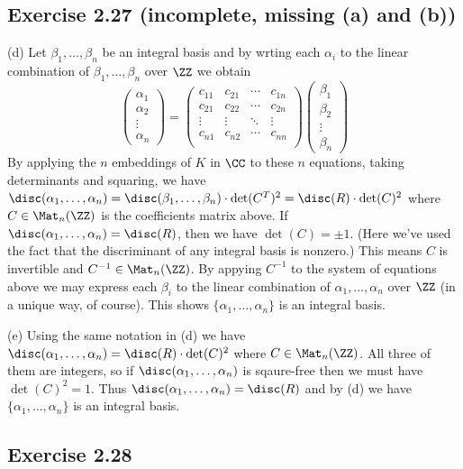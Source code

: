 \documentclass[../Chapter.tex]{subfiles}
\begin{document}
\subsection*{Exercise 2.27 \color{red}(incomplete, missing (a) and (b))}

(d) Let $\beta_1,\ldots,\beta_n$ be an integral basis and by wrting each $\alpha_i$ to the linear combination of $\beta_1,\ldots,\beta_n$ over $\ZZ$ we obtain
$$\begin{pmatrix}
\alpha_1  \\
\alpha_2 \\
\vdots \\
\alpha_n
\end{pmatrix}=
\begin{pmatrix}
c_{11}  & c_{21} & \cdots & c_{1n} \\
c_{21} & c_{22} & \cdots & c_{2n} \\
\vdots & \vdots  & \ddots & \vdots \\
c_{n1} & c_{n2} & \cdots & c_{nn} \\
\end{pmatrix}
\begin{pmatrix}
\beta_1 \\
\beta_2 \\
\vdots \\
\beta_n
\end{pmatrix}$$
By applying the $n$ embeddings of $K$ in $\CC$ to these $n$ equations, taking determinants and squaring, we have $\disc(\alpha_1,\ldots,\alpha_n)=\disc(\beta_1,\ldots,\beta_n)\cdot \det(C^T)^2=\disc(R)\cdot \det(C)^2$ where $C\in\Mat_n(\ZZ)$ is the coefficients matrix above. If $\disc(\alpha_1,\ldots,\alpha_n)=\disc(R)$, then we have $\det(C)=\pm 1$. (Here we've used the fact that the discriminant of any integral basis is nonzero.) This means $C$ is invertible and $C^{-1}\in\Mat_n(\ZZ)$. By appying $C^{-1}$ to the system of equations above we may express each $\beta_i$ to the linear combination of $\alpha_1,\ldots,\alpha_n$ over $\ZZ$ (in a unique way, of course). This shows $\{\alpha_1,\ldots,\alpha_n\}$ is an integral basis.

(e) Using the same notation in (d) we have $\disc(\alpha_1,\ldots,\alpha_n)=\disc(R)\cdot \det(C)^2$ where $C\in\Mat_n(\ZZ)$. All three of them are integers, so if $\disc(\alpha_1,\ldots,\alpha_n)$ is sqaure-free then we must have $\det(C)^2=1$. Thus $\disc(\alpha_1,\ldots,\alpha_n)=\disc(R)$ and by (d) we have $\{\alpha_1,\ldots,\alpha_n\}$ is an integral basis.

\subsection*{Exercise 2.28}
\end{document}
